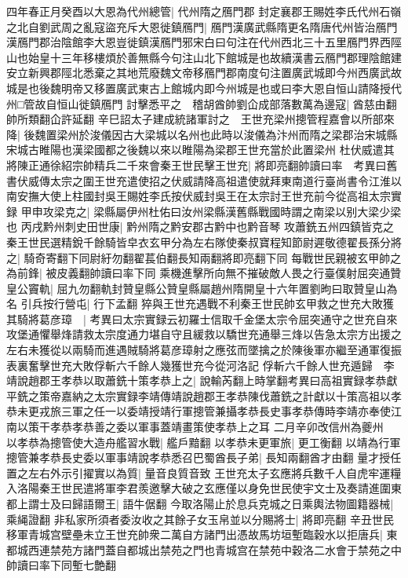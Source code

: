 四年春正月癸酉以大恩為代州總管|{
	代州隋之鴈門郡}
封定襄郡王賜姓李氏代州石嶺之北自劉武周之亂寇盜充斥大恩徙鎮鴈門|{
	鴈門漢廣武縣隋更名隋唐代州皆治鴈門漢鴈門郡治陰館李大恩豈徙鎮漢鴈門邪宋白曰句注在代州西北三十五里鴈門界西陘山也始皇十三年移樓煩於善無縣今句注山北下館城是也故續漢書云鴈門郡理陰館建安立新興郡陘北悉棄之其地荒廢魏文帝移鴈門郡南度句注置廣武城即今州西廣武故城是也後魏明帝又移置廣武東古上館城内即今州城是也或曰李大恩自恒山請降授代州□管故自恒山徙鎮鴈門}
討擊悉平之　稽胡酋帥劉仚成部落數萬為邊寇|{
	酋慈由翻帥所類翻仚許延翻}
辛巳詔太子建成統諸軍討之　王世充梁州摠管程嘉會以所部來降|{
	後魏置梁州於浚儀因古大梁城以名州也此時以浚儀為汴州而隋之梁郡治宋城縣宋城古睢陽也漢梁國都之後魏以來以睢陽為梁郡王世充當於此置梁州}
杜伏威遣其將陳正通徐紹宗帥精兵二千來會秦王世民擊王世充|{
	將即亮翻帥讀曰率　考異曰舊書伏威傳太宗之圍王世充遣使招之伏威請降高祖遣使就拜東南道行臺尚書令江淮以南安撫大使上柱國封吳王賜姓李氏按伏威封吳王在太宗討王世充前今從高祖太宗實録}
甲申攻梁克之|{
	梁縣屬伊州杜佑曰汝州梁縣漢舊縣戰國時謂之南梁以别大梁少梁也}
丙戌黔州刺史田世康|{
	黔州隋之黔安郡古黔中也黔音琴}
攻蕭銑五州四鎮皆克之　秦王世民選精銳千餘騎皆皁衣玄甲分為左右隊使秦叔寶程知節尉遲敬德翟長孫分將之|{
	騎奇寄翻下同尉紆勿翻翟萇伯翻長知兩翻將即亮翻下同}
每戰世民親被玄甲帥之為前鋒|{
	被皮義翻帥讀曰率下同}
乘機進擊所向無不摧破敵人畏之行臺僕射屈突通贊皇公竇軌|{
	屈九勿翻軌封贊皇縣公贊皇縣屬趙州隋開皇十六年置劉昫曰取贊皇山為名}
引兵按行營屯|{
	行下孟翻}
猝與王世充遇戰不利秦王世民帥玄甲救之世充大敗獲其騎將葛彦璋　|{
	考異曰太宗實録云初羅士信取千金堡太宗令屈突通守之世充自來攻堡通懼舉烽請救太宗度通力堪自守且緩救以驕世充通舉三烽以告急太宗方出援之左右未獲從以兩騎而進遇賊騎將葛彦璋射之應弦而墜擒之於陳後軍亦繼至通軍復振表裏奮擊世充大敗俘斬六千餘人幾獲世充今從河洛記}
俘斬六千餘人世充遁歸　李靖說趙郡王孝恭以取蕭銑十策孝恭上之|{
	說輸芮翻上時掌翻考異曰高祖實録孝恭獻平銑之策帝嘉納之太宗實録李靖傳靖說趙郡王孝恭陳伐蕭銑之計獻以十策高祖以孝恭未更戎旅三軍之任一以委靖授靖行軍摠管兼攝孝恭長史事孝恭傳時李靖亦奉使江南以策干孝恭孝恭善之委以軍事蓋靖畫策使孝恭上之耳}
二月辛卯改信州為夔州　以孝恭為摠管使大造舟艦習水戰|{
	艦戶黯翻}
以孝恭未更軍旅|{
	更工衡翻}
以靖為行軍摠管兼孝恭長史委以軍事靖說孝恭悉召巴蜀酋長子弟|{
	長知兩翻酋才由翻}
量才授任置之左右外示引擢實以為質|{
	量音良質音致}
王世充太子玄應將兵數千人自虎牢運糧入洛陽秦王世民遣將軍李君羨邀擊大破之玄應僅以身免世民使宇文士及奏請進圍東都上謂士及曰歸語爾王|{
	語牛倨翻}
今取洛陽止於息兵克城之日乘輿法物圖籍器械|{
	乘䋲證翻}
非私家所須者委汝收之其餘子女玉帛並以分賜將士|{
	將即亮翻}
辛丑世民移軍青城宫壁壘未立王世充帥衆二萬自方諸門出憑故馬坊垣塹臨穀水以拒唐兵|{
	東都城西連禁苑方諸門蓋自都城出禁苑之門也青城宫在禁苑中穀洛二水會于禁苑之中帥讀曰率下同塹七艶翻}
